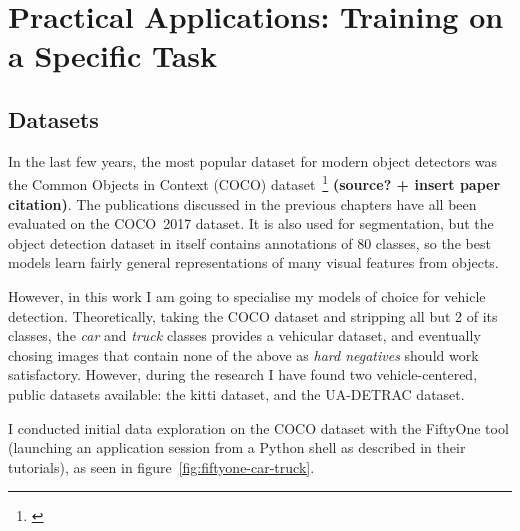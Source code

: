 \chapter{Practical Applications: Training on a Specific Task}

\section{Datasets}

In the last few years, the most popular dataset for modern object detectors was the Common Objects in Context (COCO) dataset~\footnote{\url{}} \textbf{(source? + insert paper citation)}. The publications discussed in the previous chapters have all been evaluated on the COCO~2017 dataset. It is also used for segmentation, but the object detection dataset in itself contains annotations of 80 classes, so the best models learn fairly general representations of many visual features from objects.

However, in this work I am going to specialise my models of choice for vehicle detection. Theoretically, taking the COCO dataset and stripping all but 2 of its classes, the \textit{car} and \textit{truck} classes provides a vehicular dataset, and eventually chosing images that contain none of the above as \textit{hard negatives} should work satisfactory. However, during the research I have found two vehicle-centered, public datasets available: the kitti dataset, and the UA-DETRAC dataset.

I conducted initial data exploration on the COCO dataset with the FiftyOne tool (launching an application session from a Python shell as described in their tutorials), as seen in figure~\ref{fig:fiftyone-car-truck}.


